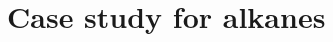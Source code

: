 \documentclass[journal=jctc,manuscript=article]{achemso}
\begin{document}

\section{Case study for alkanes} \label{Case Study}
\end{document}
